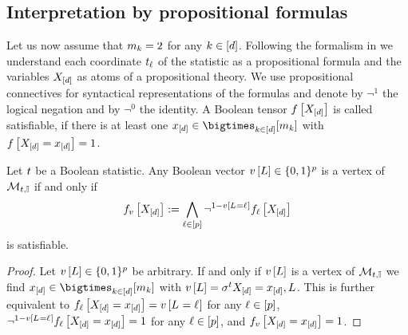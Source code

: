 \subsection{Interpretation by propositional formulas}

Let us now assume that $m_{k}=2$ for any $k\in[d]$.
Following the formalism in \cite{goessmann_tensor_2026} we understand each coordinate $t_{\ell}$ of the statistic as a propositional formula and the variables $X_{[d]}$ as atoms of a propositional theory.
We use propositional connectives for syntactical representations of the formulas and denote by $\lnot^{1}$ the logical negation and by $\lnot^{0}$ the identity.
A Boolean tensor $f\left[X_{[d]}\right]$ is called satisfiable, if there is at least one $\shortcatindicesin$ with $f\left[X_{[d]}=x_{[d]}\right]=1$.

\begin{theorem}\label{the:boolVecSat}
    Let $t$ be a Boolean statistic.
    Any Boolean vector $v\left[L\right]\in\{0,1\}^{p}$ is a vertex of $\mathcal{M}_{t,\mathbb{I}}$ if and only if
    \begin{align*}
        f_{v}\left[X_{[d]}\right]
        := \bigwedge_{\ell\in[p]} \lnot^{1-v\left[L_{}=\ell_{}\right]} f_{\ell}\left[X_{[d]}\right]
    \end{align*}
    is satisfiable.
\end{theorem}
\begin{proof}
    Let $v\left[L\right]\in\{0,1\}^{p}$ be arbitrary.
    If and only if $v\left[L\right]$ is a vertex of $\mathcal{M}_{t,\mathbb{I}}$ we find $\shortcatindicesin$ with $v\left[L\right]=\sigma^{t}{X_{[d]}=x_{[d]},L}$.
    This is further equivalent to $f_{\ell}\left[X_{[d]}=x_{[d]}\right]=v\left[L_{}=\ell_{}\right]$ for any $\ell\in[p]$, $\lnot^{1-v\left[L_{}=\ell_{}\right]}f_{\ell}\left[X_{[d]}=x_{[d]}\right]=1$ for any $\ell\in[p]$, and $f_{v}\left[X_{[d]}=x_{[d]}\right]=1$.
\end{proof}

